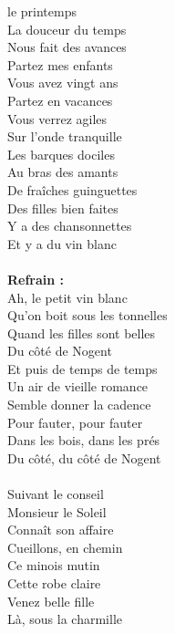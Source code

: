 
 le printemps
\\La douceur du temps
\\Nous fait des avances
\\Partez mes enfants
\\Vous avez vingt ans
\\Partez en vacances
\\Vous verrez agiles
\\Sur l'onde tranquille
\\Les barques dociles
\\Au bras des amants
\\De fraîches guinguettes
\\Des filles bien faites
\\Y a des chansonnettes
\\Et y a du vin blanc
\\\\\textbf{Refrain :}
\\Ah, le petit vin blanc
\\Qu'on boit sous les tonnelles
\\Quand les filles sont belles
\\Du côté de Nogent
\\Et puis de temps de temps
\\Un air de vieille romance
\\Semble donner la cadence
\\Pour fauter, pour fauter
\\Dans les bois, dans les prés
\\Du côté, du côté de Nogent
\breakpage
\\\\Suivant le conseil
\\Monsieur le Soleil
\\Connaît son affaire
\\Cueillons, en chemin
\\Ce minois mutin
\\Cette robe claire
\\Venez belle fille
\\Là, sous la charmille

